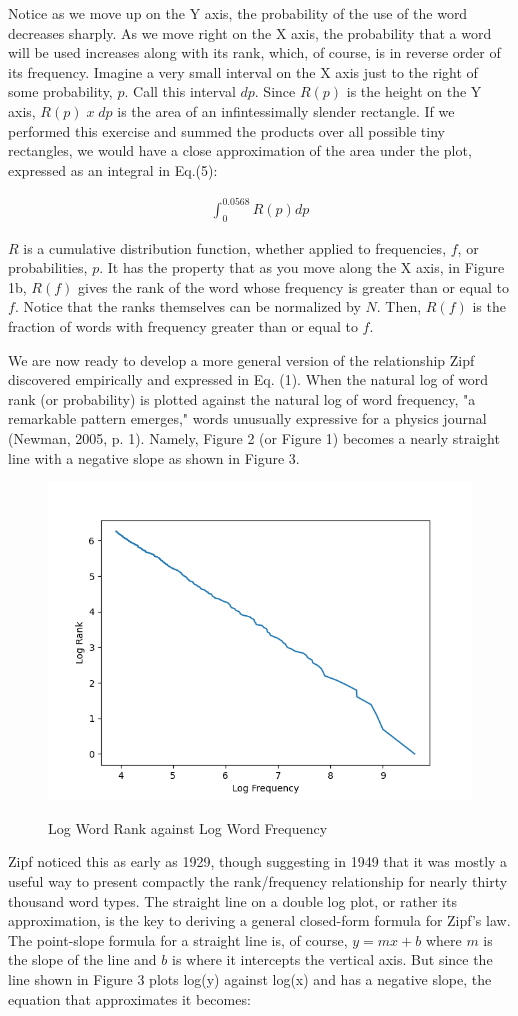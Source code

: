 \documentclass[12pt]{article}
\begin{document}
Notice as we move up on the Y axis, the probability of the use of the word decreases sharply.  As we move right on the X axis, the probability that a word will be used increases along with its rank, which, of course, is in reverse order of its frequency.  Imagine a very small interval on the X axis just to the right of some probability, $p$.  Call this interval $dp$.  Since $R(p)$ is the height on the Y axis, $R(p)\; x\; dp$ is the area of an infintessimally slender rectangle.  If we performed this exercise and summed the products over all possible tiny rectangles, we would have a close approximation of the area under the plot, expressed as an integral in Eq.(5):

\begin{align}
\int_{0}^{0.0568} R(p)dp
\end{align}

$R$ is a cumulative distribution function, whether applied to frequencies, $f$, or probabilities, $p$.  It has the property that as you move along the X axis, in Figure 1b,  $R(f)$ gives the rank of the word whose frequency is greater than or equal to $f$.  Notice that the ranks themselves can be normalized by $N$.  Then, $R(f)$ is the fraction of words with frequency greater than or equal to $f$. 

We are now ready to develop a more general version of the relationship Zipf discovered empirically and expressed in Eq. (1).  When the natural log of word rank (or probability) is plotted against the natural log of word frequency, "a remarkable pattern emerges," words unusually expressive for a physics journal (Newman, 2005, p. 1).  Namely, Figure 2 (or Figure 1) becomes a nearly straight line with a negative slope as shown in Figure 3.  

\begin{figure}[h]
    \centering
    \includegraphics[width=.4\textwidth]{ulyssesLogRXF.png}\\
    \caption{Log Word Rank against Log Word Frequency}%
\end{figure}

Zipf noticed this as early as 1929, though suggesting in 1949 that it was mostly a useful way to present compactly the rank/frequency relationship for nearly thirty thousand word types.   The straight line on a double log plot, or rather its approximation, is the key to deriving a general closed-form formula for Zipf's law.  The point-slope formula for a straight line is, of course, $y = mx + b$ where $m$ is the slope of the line and $b$ is where it intercepts the vertical axis.  But since the line shown in Figure 3 plots log(y) against log(x) and has a negative slope, the equation that approximates it becomes:
\end{document}
